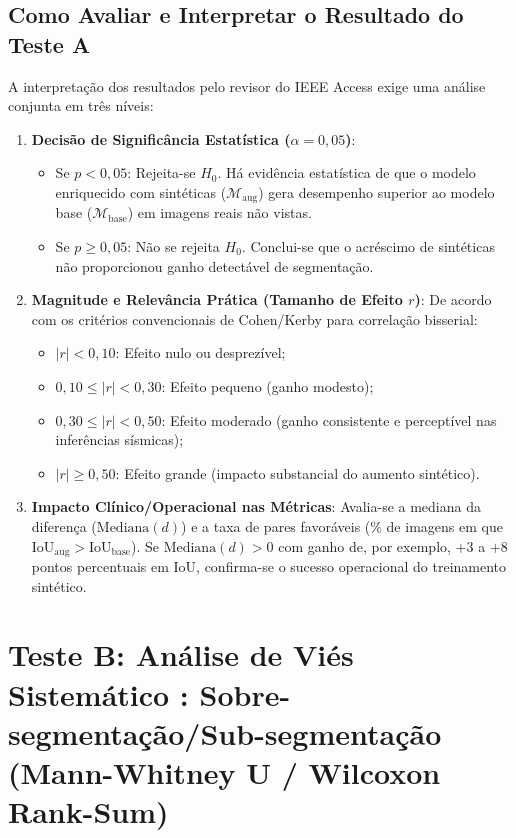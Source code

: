 \documentclass[11pt,a4paper]{article}
\begin{document}
\subsection{Como Avaliar e Interpretar o Resultado do Teste A}
A interpretação dos resultados pelo revisor do IEEE Access exige uma análise conjunta em três níveis:
\begin{enumerate}
    \item \textbf{Decisão de Significância Estatística ($\alpha = 0{,}05$)}:
    \begin{itemize}
        \item Se $p < 0{,}05$: Rejeita-se $H_0$. Há evidência estatística de que o modelo enriquecido com sintéticas ($\mathcal{M}_{\text{aug}}$) gera desempenho superior ao modelo base ($\mathcal{M}_{\text{base}}$) em imagens reais não vistas.
        \item Se $p \ge 0{,}05$: Não se rejeita $H_0$. Conclui-se que o acréscimo de sintéticas não proporcionou ganho detectável de segmentação.
    \end{itemize}
    \item \textbf{Magnitude e Relevância Prática (Tamanho de Efeito $r$)}:
    De acordo com os critérios convencionais de Cohen/Kerby para correlação bisserial:
    \begin{itemize}
        \item $|r| < 0{,}10$: Efeito nulo ou desprezível;
        \item $0{,}10 \le |r| < 0{,}30$: Efeito pequeno (ganho modesto);
        \item $0{,}30 \le |r| < 0{,}50$: Efeito moderado (ganho consistente e perceptível nas inferências sísmicas);
        \item $|r| \ge 0{,}50$: Efeito grande (impacto substancial do aumento sintético).
    \end{itemize}
    \item \textbf{Impacto Clínico/Operacional nas Métricas}:
    Avalia-se a mediana da diferença ($\text{Mediana}(d)$) e a taxa de pares favoráveis (\% de imagens em que $\text{IoU}_{\text{aug}} > \text{IoU}_{\text{base}}$). Se $\text{Mediana}(d) > 0$ com ganho de, por exemplo, $+3$ a $+8$ pontos percentuais em IoU, confirma-se o sucesso operacional do treinamento sintético.
\end{enumerate}

\section{Teste B: Análise de Viés Sistemático : Sobre-segmentação/Sub-segmentação (Mann-Whitney U / Wilcoxon Rank-Sum)}
\end{document}
